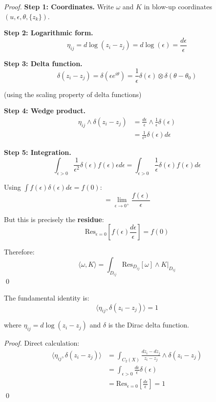 \begin{proof}
\textbf{Step 1: Coordinates.}
Write $\omega$ and $K$ in blow-up coordinates $(u, \epsilon, \theta, \{z_k\})$.

\textbf{Step 2: Logarithmic form.}
$$\eta_{ij} = d\log(z_i - z_j) = d\log(\epsilon) = \frac{d\epsilon}{\epsilon}$$

\textbf{Step 3: Delta function.}
$$\delta(z_i - z_j) = \delta(\epsilon e^{i\theta}) = \frac{1}{\epsilon} \delta(\epsilon) \otimes 
\delta(\theta - \theta_0)$$

(using the scaling property of delta functions)

\textbf{Step 4: Wedge product.}
\begin{align*}
\eta_{ij} \wedge \delta(z_i - z_j) &= \frac{d\epsilon}{\epsilon} \wedge \frac{1}{\epsilon} 
\delta(\epsilon)\\
&= \frac{1}{\epsilon^2} \delta(\epsilon) d\epsilon
\end{align*}

\textbf{Step 5: Integration.}
$$\int_{\epsilon > 0} \frac{1}{\epsilon^2} \delta(\epsilon) f(\epsilon) \epsilon d\epsilon 
= \int_{\epsilon > 0} \frac{1}{\epsilon} \delta(\epsilon) f(\epsilon) d\epsilon$$

Using $\int f(\epsilon) \delta(\epsilon) d\epsilon = f(0)$:
$$= \lim_{\epsilon \to 0^+} \frac{f(\epsilon)}{\epsilon}$$

But this is precisely the \textbf{residue}:
$$\text{Res}_{\epsilon=0}\left[f(\epsilon) \frac{d\epsilon}{\epsilon}\right] = f(0)$$

Therefore:
$$\langle \omega, K \rangle = \int_{D_{ij}} \text{Res}_{D_{ij}}[\omega] \wedge K|_{D_{ij}}$$
\qed
\end{proof}

\begin{corollary}\label{cor:res-delta-pairing}
The fundamental identity is:
$$\boxed{\langle \eta_{ij}, \delta(z_i - z_j) \rangle = 1}$$

where $\eta_{ij} = d\log(z_i - z_j)$ and $\delta$ is the Dirac delta function.
\end{corollary}

\begin{proof}
Direct calculation:
\begin{align*}
\langle \eta_{ij}, \delta(z_i - z_j) \rangle &= \int_{C_2(X)} \frac{dz_i - dz_j}{z_i - z_j} 
\wedge \delta(z_i - z_j)\\
&= \int_{\epsilon > 0} \frac{d\epsilon}{\epsilon} \delta(\epsilon)\\
&= \text{Res}_{\epsilon=0}\left[\frac{d\epsilon}{\epsilon}\right] = 1
\end{align*}
\qed
\end{proof}

